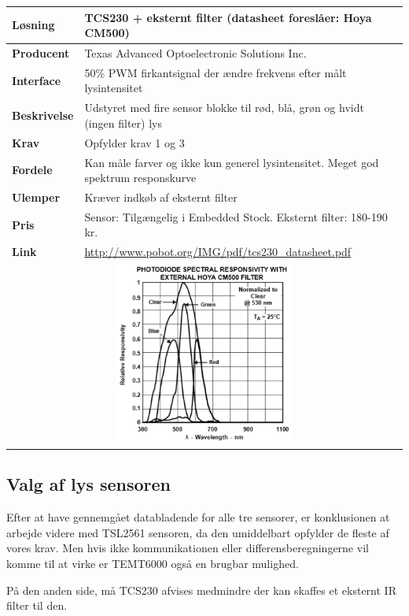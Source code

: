 \begin{table}[H] \centering
\begin{tabular}{|p{3cm}|p{11cm}|}
	\hline
	\textbf{Løsning}		
		& TCS230 + eksternt filter (datasheet foreslåer: Hoya CM500) 
	\\ \hline
	\textbf{Producent} 		
		& Texas Advanced Optoelectronic Solutions Inc. 
	\\ \hline
	\textbf{Interface} 		
		& 50\% PWM firkantsignal der ændre frekvens efter målt lysintensitet
	\\ \hline
	\textbf{Beskrivelse} 	
		& Udstyret med fire sensor blokke til rød, blå, grøn og hvidt (ingen filter) lys 
	\\ \hline
	\textbf{Krav} 			
		& Opfylder krav 1 og 3 
	\\ \hline
	\textbf{Fordele}		
		& Kan måle farver og ikke kun generel lysintensitet. Meget god spektrum responskurve 
	\\ \hline
	\textbf{Ulemper} 		
		& Kræver indkøb af eksternt filter 
	\\ \hline
	\textbf{Pris} 			
		& Sensor: Tilgængelig i Embedded Stock. Eksternt filter: 180-190 kr. 
    \\ \hline
    \textbf{Link} 			
        & \url{http://www.pobot.org/IMG/pdf/tcs230_datasheet.pdf}
	\\ \hline
	\multicolumn{2}{|c|}{\includegraphics[height=6cm]{0_Filer/Figuer/Forudundersoegelse/TCS230-CM500.png}} 	
    \\ \hline
\end{tabular}
\end{table}

\subsection{Valg af lys sensoren}

Efter at have gennemgået databladende for alle tre sensorer, er konklusionen at arbejde videre med TSL2561 sensoren, da den umiddelbart opfylder de fleste af vores krav. Men hvis ikke kommunikationen eller differensberegningerne vil komme til at virke er TEMT6000 også en brugbar mulighed.

På den anden side, må TCS230 afvises medmindre der kan skaffes et eksternt IR filter til den.